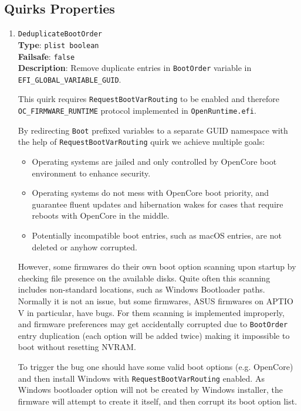 \documentclass[]{article}
\providecommand{\tightlist}{%
  \setlength{\itemsep}{0pt}\setlength{\parskip}{0pt}}
\begin{document}
\subsection{Quirks Properties}\label{uefiquirkprops}

\begin{enumerate}

\item
  \texttt{DeduplicateBootOrder}\\
  \textbf{Type}: \texttt{plist\ boolean}\\
  \textbf{Failsafe}: \texttt{false}\\
  \textbf{Description}: Remove duplicate entries in \texttt{BootOrder} variable
  in \texttt{EFI\_GLOBAL\_VARIABLE\_GUID}.

  This quirk requires \texttt{RequestBootVarRouting} to be enabled and therefore
  \texttt{OC\_FIRMWARE\_RUNTIME} protocol implemented in \texttt{OpenRuntime.efi}.

  By redirecting \texttt{Boot} prefixed variables to a separate GUID namespace
  with the help of \texttt{RequestBootVarRouting} quirk we achieve multiple goals:
  \begin{itemize}
  \tightlist
  \item Operating systems are jailed and only controlled by OpenCore boot
  environment to enhance security.
  \item Operating systems do not mess with OpenCore boot priority, and guarantee
  fluent updates and hibernation wakes for cases that require reboots with OpenCore
  in the middle.
  \item Potentially incompatible boot entries, such as macOS entries, are not deleted
  or anyhow corrupted.
  \end{itemize}

  However, some firmwares do their own boot option scanning upon startup by checking
  file presence on the available disks. Quite often this scanning includes non-standard
  locations, such as Windows Bootloader paths. Normally it is not an issue, but some
  firmwares, ASUS firmwares on APTIO V in particular, have bugs. For them scanning is
  implemented improperly, and firmware preferences may get accidentally corrupted
  due to \texttt{BootOrder} entry duplication (each option will be added twice) making
  it impossible to boot without resetting NVRAM.

  To trigger the bug one should have some valid boot options (e.g. OpenCore) and then
  install Windows with \texttt{RequestBootVarRouting} enabled. As Windows bootloader
  option will not be created by Windows installer, the firmware will attempt to create it
  itself, and then corrupt its boot option list.


\end{enumerate}
\end{document}
